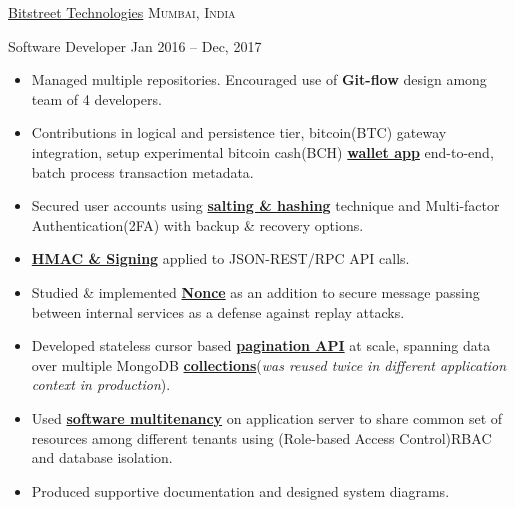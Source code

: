 \documentclass[10pt,a4paper]{article}
\begin{document}



\headedsection
  {\href{http://bitstreet.in/}{Bitstreet Technologies}}
  {\textsc{Mumbai, India}}
  {%
    \headedsubsection
    {Software Developer}
    {Jan 2016 -- Dec, 2017}
    {
      \begin{itemize}
        \item Managed multiple repositories. Encouraged use of \textbf{Git-flow} design among team of 4 developers.
        \item Contributions in logical and persistence tier, bitcoin(BTC) gateway integration, setup experimental bitcoin cash(BCH) \href{https://rihbyne.github.io/diy/digital-wallet/}{\textbf{wallet app}} end-to-end, batch process transaction metadata.
        \item Secured user accounts using \href{https://rihbyne.github.io/blog/user-auth/}{\textbf{salting \& hashing}} technique and Multi-factor Authentication(2FA) with backup \& recovery options.
        \item \href{https://rihbyne.github.io/blog/hmac-authentication/}{\textbf{HMAC \& Signing}} applied to JSON-REST/RPC API calls.
        \item Studied \& implemented \href{https://rihbyne.github.io/diy/nonce-auth-systems/}{\textbf{Nonce}} as an addition to secure message passing between internal services as a defense against replay attacks.
        \item Developed stateless cursor based \href{https://rihbyne.github.io/diy/stateless-pagination/}{\textbf{pagination API}} at scale, spanning data over multiple MongoDB \href{https://rihbyne.github.io/diy/notification-core/}{\textbf{collections}}(\textit{was reused twice in different application context in production}).
        \item Used \href{https://rihbyne.github.io/diy/multi-tenancy/}{\textbf{software multitenancy}} on application server to share common set of resources among different tenants using (Role-based Access Control)RBAC and database isolation.
        \item Produced supportive documentation and designed system diagrams.
      \end{itemize}
    }
  }
\end{document}
